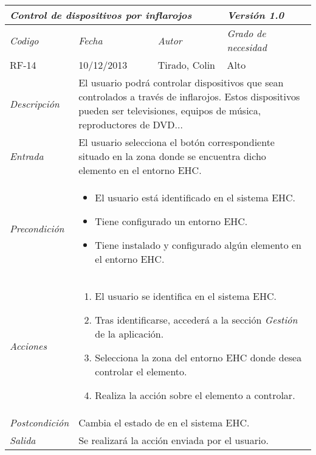 \begin{center}
    \begin{tabular}{|p{3cm}|p{4cm}|p{4cm}|p{4cm}|}
    \hline \multicolumn{3}{|p{9cm}|}{\textit{Control de dispositivos por inflarojos}} & \textit{Versi\'on 1.0} \\
    \hline \textit{Codigo} & \textit{Fecha} & \textit{Autor} & \textit{Grado de necesidad} \\
    RF-14 & 10/12/2013 & Tirado, Colin & Alto \\
    \hline \textit{Descripci\'on} & \multicolumn{3}{|p{9cm}|}{El usuario podr\'a controlar dispositivos que sean controlados a trav\'es de inflarojos. Estos dispositivos pueden ser televisiones, equipos de m\'usica, reproductores de DVD...} \\
    \hline \textit{Entrada} & \multicolumn{3}{|p{9cm}|}{El usuario selecciona el bot\'on correspondiente situado en la zona donde se encuentra dicho elemento en el entorno EHC.} \\
    \hline \textit{Precondici\'on} & \multicolumn{3}{|p{9cm}|}{
    \begin{itemize}
    \item El usuario est\'a identificado en el sistema EHC.
    \item Tiene configurado un entorno EHC.
    \item Tiene instalado y configurado alg\'un elemento en el entorno EHC.
    \end{itemize}
    } \\
    \hline \textit{Acciones} & \multicolumn{3}{|p{9cm}|}{
    \begin{enumerate}
    \item El usuario se identifica en el sistema EHC.
    \item Tras identificarse, acceder\'a a la secci\'on \textit{Gesti\'on} de la aplicaci\'on.
    \item Selecciona la zona del entorno EHC donde desea controlar el elemento.
    \item Realiza la acci\'on sobre el elemento a controlar.
    \end{enumerate}
    } \\
    \hline \textit{Postcondici\'on} & \multicolumn{3}{|p{9cm}|}{Cambia el estado de  en el sistema EHC.} \\
    \hline \textit{Salida} & \multicolumn{3}{|p{9cm}|}{Se realizar\'a la acci\'on enviada por el usuario.} \\ \hline
    \end{tabular}
\end{center}
